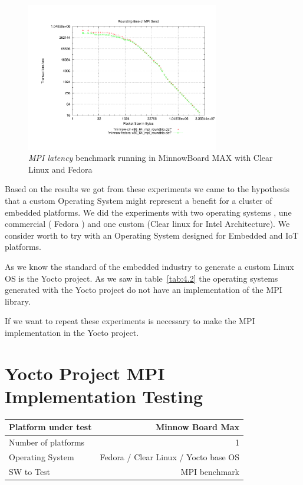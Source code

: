 \begin{figure}[H]
\centering
\includegraphics[width=0.75\textwidth]{images/mpbench_clr_experiments/mpi_roundtrip.pdf}
\caption{\textit{MPI latency} benchmark running in MinnowBoard MAX with Clear Linux and
Fedora }
\label{mpi_roundtrip_clr_fedora}
\end{figure}

Based on the results we got from these experiments we came to the hypothesis
that a custom Operating System might represent a benefit for a cluster of
embedded platforms. We did the experiments with two operating systems , une
commercial ( Fedora ) and one custom (Clear linux for Intel Architecture). We
consider worth to try with an Operating System designed for Embedded and IoT
platforms. 

As we know the standard of the embedded industry to generate a custom Linux OS
is the Yocto project. As we saw in table~\ref{tab:4.2} the operating systems
generated with the Yocto project do not have an implementation of the MPI
library. 

If we want to repeat these experiments is necessary to make the MPI
implementation in the Yocto project. 


\section{Yocto Project MPI Implementation Testing}

    \begin{center}
    \begin{tabular}{ | l | r |}
        \hline
        Platform under test & Minnow Board  Max \\ \hline
        Number of platforms  & 1  \\ \hline
        Operating System & Fedora / Clear Linux / Yocto base OS  \\ \hline
        SW to Test & MPI benchmark \\ \hline
    \end{tabular}
    \end{center}

